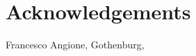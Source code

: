 \thispagestyle{plain_cover}			%
\section*{Acknowledgements}
\begin{comment}
sum of all experience form a technical poitn of view and life
thank to my supervisors


This work has also taught that we are just human, but we can do whatever we can image, especially in Computer Science.


To the day in which I learnt how to read, an important pillar of my life.
To 
\end{comment}
\vspace{1.5cm}
\hfill
Francesco Angione, Gothenburg, \monthname \space \the\year

\newpage				%
\thispagestyle{empty}
\mbox{}